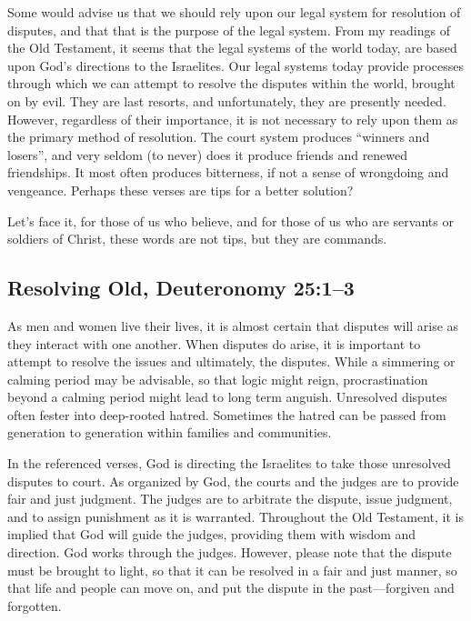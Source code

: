 \documentclass[12pt]{memoir}
\begin{document}
Some would advise us that we should rely upon our legal system for
resolution of disputes, and that that is the purpose of the legal
system. From my readings of the Old Testament, it seems that the legal
systems of the world today, are based upon God's directions to the
Israelites. Our legal systems today provide processes through which
we can attempt to resolve the disputes within the world, brought on
by evil. They are last resorts, and unfortunately, they are
presently needed. However, regardless of their importance, it is not
necessary to rely upon them as the primary method of resolution. The
court system produces ``winners and losers'', and very seldom (to
never) does it produce friends and renewed friendships. It most often
produces bitterness, if not a sense of wrongdoing and vengeance. Perhaps
these verses are tips for a better solution? 

Let's face it, for those of us who believe, and for those of us who
are servants or soldiers of Christ, these words are not tips, but
they are commands.

\subsection[Resolving Old]{Resolving Old, Deuteronomy 25:1--3}

As men and women live their lives, it is almost certain that disputes
will arise as they interact with one another. When disputes do arise,
it is important to attempt to resolve the issues and ultimately, the
disputes. While a simmering or calming period may be advisable, so
that logic might reign, procrastination beyond a calming period might
lead to long term anguish. Unresolved disputes often fester into deep-rooted hatred. Sometimes the hatred can be passed from generation to generation within families and communities.

In the referenced verses, God is directing the Israelites to take
those unresolved disputes to court. As organized by God, the courts
and the judges are to provide fair and just judgment. The judges are
to arbitrate the dispute, issue judgment, and to assign punishment
as it is warranted. Throughout the Old Testament, it is implied that
God will guide the judges, providing them with wisdom and direction.
God works through the judges. However, please note that the dispute
must be brought to light, so that it can be resolved in a fair and
just manner, so that life and people can move on, and put the dispute
in the past---forgiven and forgotten. 
\end{document}

